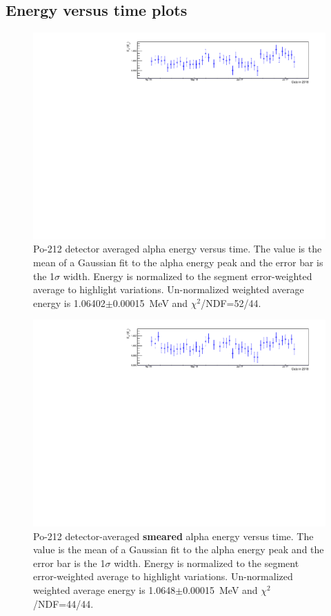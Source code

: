 \subsection{Energy versus time plots}
\begin{figure}[!h]
\centering
\includegraphics[width=1.05\textwidth]{figures/PubBiPo212EvsT.pdf}
\caption{\label{fig:EvsT212}Po-212 detector averaged alpha energy versus time. The value is the mean of a Gaussian fit to the alpha energy peak and the error bar is the 1$\sigma$ width. Energy is normalized to the segment error-weighted average to highlight variations. Un-normalized weighted average energy is 1.06402$\pm$0.00015~MeV and $\chi^2$/NDF=52/44. }
\end{figure}
\begin{figure}[!h]
\centering
\includegraphics[width=1.05\textwidth]{figures/PubBiPo212EsmearvsT.pdf}
\caption{\label{fig:EsmearvsT212}Po-212 detector-averaged {\bf smeared} alpha energy versus time. The value is the mean of a Gaussian fit to the alpha energy peak and the error bar is the 1$\sigma$ width. Energy is normalized to the segment error-weighted average to highlight variations. Un-normalized weighted average energy is 1.0648$\pm$0.00015~MeV and $\chi^2$/NDF=44/44. }
\end{figure}
